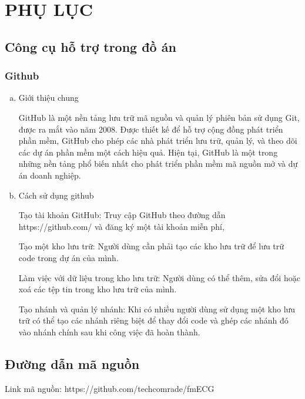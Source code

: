 
\section*{PHỤ LỤC}


\subsection*{Công cụ hỗ trợ trong đồ án}

\subsubsection*{Github}

\begin{enumerate}[a)]
  \item Giới thiệu chung
  
  GitHub là một nền tảng lưu trữ mã nguồn và quản lý phiên bản sử dụng Git, được ra mắt vào năm 2008. Được thiết kế để hỗ trợ cộng đồng phát triển phần mềm, GitHub cho phép các nhà phát triển lưu trữ, quản lý, và theo dõi các dự án phần mềm một cách hiệu quả. Hiện tại, GitHub là một trong những nền tảng phổ biến nhất cho phát triển phần mềm mã nguồn mở và dự án doanh nghiệp.
  
  \item Cách sử dụng github
  
  Tạo tài khoản GitHub: Truy cập GitHub theo đường dẫn https://github.com/ và đăng ký một tài khoản miễn phí, 

Tạo một kho lưu trữ: Người dùng cần phải tạo các kho lưu trữ để lưu trữ code trong dự án của mình.

Làm việc với dữ liệu trong kho lưu trữ: Người dùng có thể thêm, sửa đổi hoặc xoá các tệp tin trong kho lưu trữ của mình.

Tạo nhánh và quản lý nhánh: Khi có nhiều người dùng sử dụng một kho lưu trữ có thể tạo các nhánh riêng biệt để thay đổi code và ghép các nhánh đó vào nhánh chính sau khi công việc đã hoàn thành.
\end{enumerate}

\subsection*{Đường dẫn mã nguồn}

Link mã nguồn: https://github.com/techcomrade/fmECG

\clearpage
